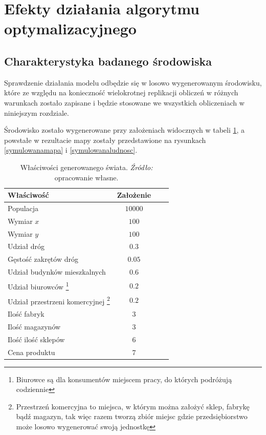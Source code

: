 \documentclass[polish, twoside, 12pt, a4paper]{article}
\theoremstyle{definition}
\theoremstyle{plain}
\theoremstyle{remark}
\begin{document}
\clearpage
\section{Efekty działania algorytmu optymalizacyjnego}

\subsection{Charakterystyka badanego środowiska}

Sprawdzenie działania modelu odbędzie się w losowo wygenerowanym środowisku, które ze względu na konieczność wielokrotnej replikacji obliczeń w różnych warunkach zostało zapisane i będzie stosowane we wszystkich obliczeniach w niniejszym rozdziale.

 Środowisko zostało wygenerowane przy założeniach widocznych w tabeli \ref{tab:zalozenia}, a powstałe w rezultacie mapy zostały przedstawione na rysunkach \ref{symulowanamapa} i \ref{symulowanaludnosc}.

\begin{table}[hbt] 
  \centering

  \captionsetup{margin=10pt,font=small,labelfont=bf,width=.8\textwidth}

  \caption[Przykład prostej tablicy]{Właściwości generowanego świata. \textit{Źródło:} opracowanie własne.}
  \label{tab:zalozenia}

\vspace*{2ex}
  \begin{tabular}{lccc}
    Właściwość        & Założenie \\ \hline
    Populacja & $10 000$\\
    Wymiar $x$ & $100$\\
    Wymiar $y$ & $100$\\ 
    Udział dróg & $0.3$\\ 
    Gęstość zakrętów dróg & $0.05$\\  
    Udział budynków mieszkalnych & $0.6$\\  
    Udział biurowców \footnote{Biurowce są dla konsumentów miejscem pracy, do których podróżują codziennie} & $0.2$\\  
    Udział przestrzeni komercyjnej \footnote{Przestrzeń komercyjna to miejsca, w którym można założyć sklep, fabrykę bądź magazyn, tak więc razem tworzą zbiór miejsc gdzie przedsiębiorstwo może losowo wygenerować swoją jednostkę}& $0.2$\\  \hline
    Ilość fabryk & 3\\ 
    Ilość magazynów & 3\\ 
    Ilość ilość sklepów & 6\\ 
    Cena produktu & 7\\ 
  \end{tabular}
\end{table}
\end{document}
